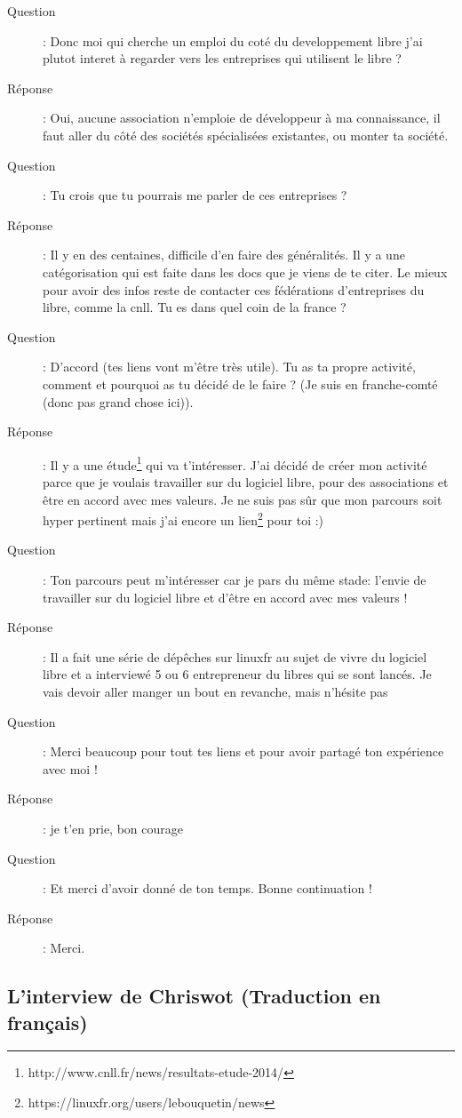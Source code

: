 \documentclass[a4paper,12pt, draft]{report}
\begin{document}
\begin{description}
\item [Question]:  Donc moi qui cherche un emploi du coté du developpement libre j'ai plutot interet à regarder vers les entreprises qui utilisent le libre ?
\item [Réponse]:  Oui, aucune association n'emploie de développeur à ma connaissance, il faut aller du côté des sociétés spécialisées existantes, ou monter ta société.
\item [Question]:  Tu crois que tu pourrais me parler de ces entreprises ?
\item [Réponse]:  Il y en des centaines, difficile d'en faire des généralités. Il y a une catégorisation qui est faite dans les docs que je viens de te citer. Le mieux pour avoir des infos reste de contacter ces fédérations d'entreprises du libre, comme la cnll. Tu es dans quel coin de la france ?
\item [Question]:  D'accord (tes liens vont m'être très utile). Tu as ta propre activité, comment et  pourquoi as tu décidé de le faire ? (Je suis en franche-comté (donc pas grand chose ici)).
\item [Réponse]:  Il y a une étude\footnote{http://www.cnll.fr/news/resultats-etude-2014/} qui va t'intéresser. J'ai décidé de créer mon activité parce que je voulais travailler sur du logiciel libre, pour des associations et être en accord avec mes valeurs. Je ne suis pas sûr que mon parcours soit hyper pertinent mais j'ai encore un lien\footnote{https://linuxfr.org/users/lebouquetin/news} pour toi :)
\item [Question]:  Ton parcours peut m'intéresser car je pars du même stade: l'envie de travailler sur du logiciel libre et d'être en accord avec mes valeurs !
\item [Réponse]:  Il a fait une série de dépêches sur linuxfr au sujet de vivre du logiciel libre et a interviewé 5 ou 6 entrepreneur du libres qui se sont lancés. Je vais devoir aller manger un bout en revanche, mais n'hésite pas
\item [Question]:  Merci beaucoup pour tout tes liens et pour avoir partagé ton expérience avec moi !
\item [Réponse]:  je t'en prie, bon courage
\item [Question]:  Et merci d'avoir donné de ton temps. Bonne continuation !
\item [Réponse]:  Merci.

\end{description}

\newpage
\subsection{L'interview de Chriswot (Traduction en français)}
\end{document}
